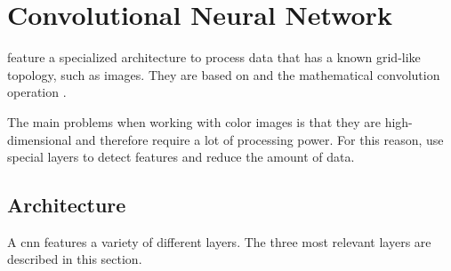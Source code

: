 \section{Convolutional Neural Network}
\label{sec:theoretical_background:cnn}

 feature a specialized architecture to process data that has a known grid-like topology, such as images.
They are based on  and the mathematical convolution operation \cite[p.~326--331]{dl}.



The main problems when working with color images is that they are high-dimensional and therefore require a lot of processing power.
For this reason,  use special layers to detect features and reduce the amount of data.

\subsection{Architecture}
\label{subsec:theoretical_background:cnn:architecture}

A \acrlong{cnn} features a variety of different layers.
The three most relevant layers are described in this section.

